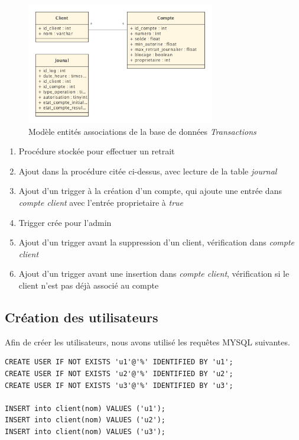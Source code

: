 \documentclass[paper=a4, fontsize=11pt]{scrartcl} %
\numberwithin{equation}{section} %
\numberwithin{figure}{section} %
\numberwithin{table}{section} %
\begin{document}
\begin{figure}[h]
  \centering
  \includegraphics[height=200px]{entites.png}
  \caption{Modèle entités associations de la base de données \textit{Transactions}}
  \label{fig:entites}
\end{figure}

\begin{enumerate}
	\item Procédure stockée pour effectuer un retrait
	\item Ajout dans la procédure citée ci-dessus, avec lecture de la table \textit{journal}
	\item Ajout d'un trigger à la création d'un compte, qui ajoute une entrée dans \textit{compte client} avec l'entrée proprietaire à \textit{true}
	\item Trigger crée pour l'admin
	\item Ajout d'un trigger avant la suppression d'un client, vérification dans \textit{compte client}
	\item Ajout d'un trigger avant une insertion dans \textit{compte client}, vérification si le client n'est pas déjà associé au compte
\end{enumerate}


\subsection{Création des utilisateurs}

Afin de créer les utilisateurs, nous avons utilisé les requêtes MYSQL suivantes. 
\begin{lstlisting}
CREATE USER IF NOT EXISTS 'u1'@'%' IDENTIFIED BY 'u1';
CREATE USER IF NOT EXISTS 'u2'@'%' IDENTIFIED BY 'u2';
CREATE USER IF NOT EXISTS 'u3'@'%' IDENTIFIED BY 'u3';

INSERT into client(nom) VALUES ('u1');
INSERT into client(nom) VALUES ('u2');
INSERT into client(nom) VALUES ('u3');
\end{lstlisting}
\end{document}
